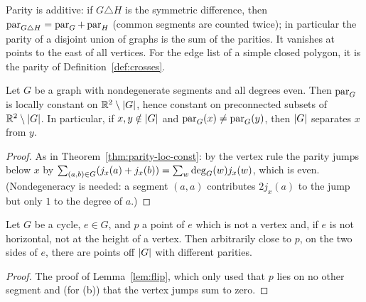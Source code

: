 
Parity is additive: if $G\triangle H$ is the symmetric difference, then
$\operatorname{par}_{G\triangle H}=\operatorname{par}_G+\operatorname{par}_H$ (common segments are counted twice); in particular the
parity of a disjoint union of graphs is the sum of the parities. It vanishes at points to the east of
all vertices. For the edge list of a simple closed polygon, it is the parity of
Definition~\ref{def:crosses}.


\begin{proposition}\label{prop:cycle-parity}
Let $G$ be a graph with nondegenerate segments and all degrees even. Then $\operatorname{par}_G$ is locally
constant on $\mathbb{R}^2\setminus\lvert G\rvert$, hence constant on preconnected subsets of $\mathbb{R}^2\setminus\lvert G\rvert$. In
particular, if $x,y\notin\lvert G\rvert$ and $\operatorname{par}_G(x)\neq\operatorname{par}_G(y)$, then $\lvert G\rvert$ separates $x$ from
$y$.
\end{proposition}

\begin{proof}
As in Theorem~\ref{thm:parity-loc-const}: by the vertex rule the parity jumps below $x$ by
$\sum_{(a,b)\in G}(j_x(a)+j_x(b))=\sum_w\operatorname{deg}_G(w)j_x(w)$, which is even. (Nondegeneracy is needed: a
segment $(a,a)$ contributes $2j_x(a)$ to the jump but only $1$ to the degree of $a$.)
\end{proof}


\begin{lemma}\label{lem:cycle-flip}
Let $G$ be a cycle, $e\in G$, and $p$ a point of $e$ which is not a vertex and, if $e$ is not
horizontal, not at the height of a vertex. Then arbitrarily close to $p$, on the two sides of $e$,
there are points off $\lvert G\rvert$ with different parities.
\end{lemma}

\begin{proof}
The proof of Lemma~\ref{lem:flip}, which only used that $p$ lies on no other segment and (for (b))
that the vertex jumps sum to zero.
\end{proof}

